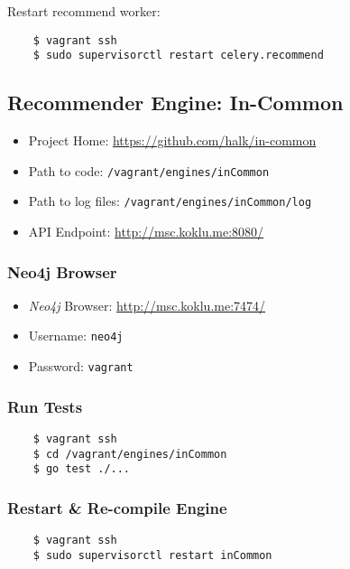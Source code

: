 Restart recommend worker:

\begin{verbatim}
    $ vagrant ssh
    $ sudo supervisorctl restart celery.recommend
\end{verbatim}


\subsection{Recommender Engine: In-Common}

\begin{itemize}
\item Project Home: \url{https://github.com/halk/in-common}
\item Path to code: \texttt{/vagrant/engines/inCommon}
\item Path to log files: \texttt{/vagrant/engines/inCommon/log}
\item API Endpoint: \url{http://msc.koklu.me:8080/}
\end{itemize}

\subsubsection{Neo4j Browser}

\begin{itemize}
\item \emph{Neo4j} Browser: \url{http://msc.koklu.me:7474/}
\item Username: \texttt{neo4j}
\item Password: \texttt{vagrant}
\end{itemize}

\subsubsection{Run Tests}

\begin{verbatim}
    $ vagrant ssh
    $ cd /vagrant/engines/inCommon
    $ go test ./...
\end{verbatim}

\subsubsection{Restart \& Re-compile Engine}

\begin{verbatim}
    $ vagrant ssh
    $ sudo supervisorctl restart inCommon
\end{verbatim}


